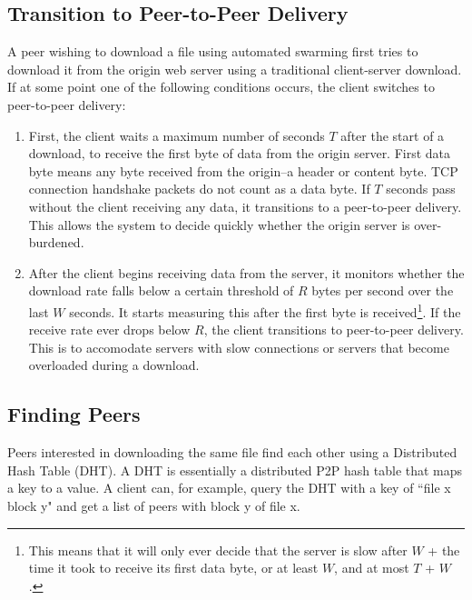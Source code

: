 \subsection{Transition to Peer-to-Peer Delivery}

A peer wishing to download a file using automated swarming first tries to download it from the origin web server using a traditional client-server download.  
If at some point one of the following conditions occurs, the client switches to peer-to-peer delivery:
\begin{enumerate}
\item First, the client waits a maximum number of seconds $T$ after the start of a download, to receive the first byte of data from the origin server.  
First data byte means any byte received from the origin--a header or content byte.  TCP connection handshake packets do not count as a data byte.
If $T$ seconds pass without the client receiving any data, it transitions to a peer-to-peer delivery.  This allows the system to decide quickly whether the origin server is over-burdened.   
\item After the client begins receiving data from the server, it monitors whether the download rate falls below a certain 
threshold of $R$ bytes per second over the last $W$ seconds.  It starts measuring this after the first byte is received\footnote{This means that it will
only ever decide that the server is slow after $W$ + the time it took to receive its first data byte, or at least $W$, and at most $T$ + $W$.}.  
If the receive rate ever drops below $R$, the client transitions to peer-to-peer delivery.  
This is to accomodate servers with slow connections or servers that become overloaded during a download.
\end{enumerate}

\subsection{Finding Peers}

Peers interested in downloading the same file find each other using a Distributed Hash Table (DHT).
A DHT is essentially a distributed P2P hash table that maps a key to a value.  A client can,
for example, query the DHT with a key of ``file x block y" and get a list of peers with block y
of file x.

